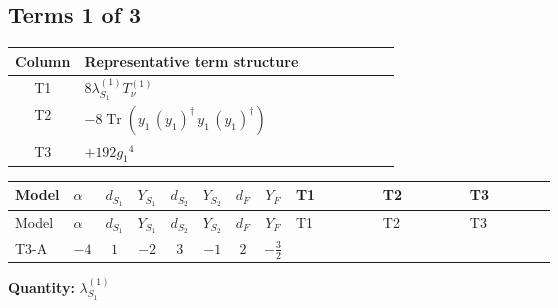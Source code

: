 \documentclass[8pt]{article}
\begin{document}
\begin{landscape}
\subsection*{Terms 1 of 3}
\begin{center}
\begin{tabular}{@{}c >{\raggedright\arraybackslash}p{0.82\linewidth}@{}}
\toprule
Column & Representative term structure \\
\midrule
T1 & \(\displaystyle 8 {\lambda_{S_1}^{(1)}} T_{\nu}^{(1)}\) \\
\midrule
T2 & \(\displaystyle -8 \operatorname{Tr}\!\left({y_1}\,\left({y_1}\right)^{\dagger}\,{y_1}\,\left({y_1}\right)^{\dagger}\right)\) \\
\midrule
T3 & \(\displaystyle +192 {g_1}^4\) \\
\midrule
\bottomrule
\end{tabular}
\end{center}
\smallskip
\tiny
\begin{longtable}{@{}llcccccc >{\raggedright\arraybackslash}p{0.21\linewidth} >{\raggedright\arraybackslash}p{0.21\linewidth} >{\raggedright\arraybackslash}p{0.21\linewidth}@{}}
\toprule
Model & $\alpha$ & $d_{S_1}$ & $Y_{S_1}$ & $d_{S_2}$ & $Y_{S_2}$ & $d_F$ & $Y_F$ & T1 & T2 & T3 \\
\midrule
\endfirsthead
\toprule
Model & $\alpha$ & $d_{S_1}$ & $Y_{S_1}$ & $d_{S_2}$ & $Y_{S_2}$ & $d_F$ & $Y_F$ & T1 & T2 & T3 \\
\midrule
\endhead
T3-A & $-4$ & $1$ & $-2$ & $3$ & $-1$ & $2$ & $-\frac{3}{2}$ & \scriptsize\adjustbox{max width=\linewidth}{$\begin{gathered} 8 {\lambda_{S_1}^{(1)}} T_{\nu}^{(1)}\end{gathered}$} & \scriptsize\adjustbox{max width=\linewidth}{$\begin{gathered} -8 \operatorname{Tr}\!\left({y_1}\,\left({y_1}\right)^{\dagger}\,{y_1}\,\left({y_1}\right)^{\dagger}\right)\end{gathered}$} & \scriptsize\adjustbox{max width=\linewidth}{$\begin{gathered} +192 {g_1}^4\end{gathered}$} \\
\midrule
\bottomrule
\end{longtable}
\clearpage
\noindent\textbf{Quantity: }$\lambda_{S_1}^{(1)}$\par\smallskip

\end{landscape}
\end{document}

